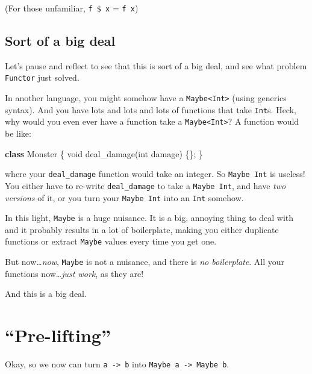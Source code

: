 \documentclass[]{article}
\newenvironment{Shaded}{\begin{snugshade}}{\end{snugshade}}
\newcommand{\DataTypeTok}[1]{\textcolor[rgb]{0.13,0.29,0.53}{#1}}
\newcommand{\FunctionTok}[1]{\textcolor[rgb]{0.00,0.00,0.00}{#1}}
\newcommand{\KeywordTok}[1]{\textcolor[rgb]{0.13,0.29,0.53}{\textbf{#1}}}
\newcommand{\NormalTok}[1]{#1}
\begin{document}
(For those unfamiliar, \texttt{f\ \$\ x} = \texttt{f\ x})

\hypertarget{sort-of-a-big-deal}{%
\subsection{Sort of a big deal}\label{sort-of-a-big-deal}}

Let's pause and reflect to see that this is sort of a big deal, and see what
problem \texttt{Functor} just solved.

In another language, you might somehow have a
\texttt{Maybe\textless{}Int\textgreater{}} (using generics syntax). And you have
lots and lots and lots of functions that take \texttt{Int}s. Heck, why would you
even ever have a function take a \texttt{Maybe\textless{}Int\textgreater{}}? A
function would be like:

\begin{Shaded}
\begin{Highlighting}[]
\KeywordTok{class}\NormalTok{ Monster \{}
    \DataTypeTok{void} \FunctionTok{deal_damage}\NormalTok{(}\DataTypeTok{int}\NormalTok{ damage) \{\};}
\NormalTok{\}}
\end{Highlighting}
\end{Shaded}

where your \texttt{deal\_damage} function would take an integer. So
\texttt{Maybe\ Int} is useless! You either have to re-write
\texttt{deal\_damage} to take a \texttt{Maybe\ Int}, and have \emph{two
versions} of it, or you turn your \texttt{Maybe\ Int} into an \texttt{Int}
somehow.

In this light, \texttt{Maybe} is a huge nuisance. It is a big, annoying thing to
deal with and it probably results in a lot of boilerplate, making you either
duplicate functions or extract \texttt{Maybe} values every time you get one.

But now\ldots{}\emph{now}, \texttt{Maybe} is not a nuisance, and there is
\emph{no boilerplate}. All your functions now\ldots{}\emph{just work}, as they
are!

And this is a big deal.

\hypertarget{pre-lifting}{%
\section{``Pre-lifting''}\label{pre-lifting}}

Okay, so we now can turn \texttt{a\ -\textgreater{}\ b} into
\texttt{Maybe\ a\ -\textgreater{}\ Maybe\ b}.
\end{document}
